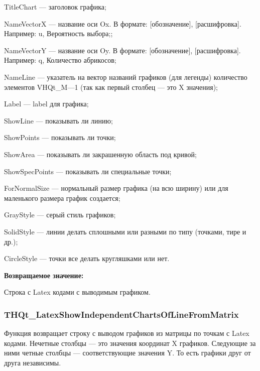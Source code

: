 \documentclass[a4paper,12pt]{article}
\begin{document}
TitleChart --- заголовок графика;
 
NameVectorX --- название оси Ox. В формате: [обозначение], [расшифровка]. Например: u, Вероятность выбора;;
 
NameVectorY --- название оси Oy. В формате: [обозначение], [расшифровка]. Например: q, Количество абрикосов;
 
NameLine --- указатель на вектор названий графиков (для легенды) количество элементов VHQt\_M---1 (так как первый столбец --- это X значения);
 
Label --- label для графика;
 
ShowLine --- показывать ли линию;
 
ShowPoints --- показывать ли точки;
 
ShowArea --- показывать ли закрашенную область под кривой;
 
ShowSpecPoints --- показывать ли специальные точки;
 
ForNormalSize --- нормальный размер графика (на всю ширину) или для маленького размера график создается;
 
GrayStyle --- серый стиль графиков;
 
SolidStyle --- линии делать сплошными или разными по типу (точками, тире и др.);
 
CircleStyle --- точки все делать кругляшками или нет.
	
\textbf{Возвращаемое значение:}

Строка с Latex кодами с выводимым графиком.


\subsubsection{THQt\_LatexShowIndependentChartsOfLineFromMatrix}\label{THQt_LatexShowIndependentChartsOfLineFromMatrix}

Функция возвращает строку с выводом графиков из матрицы по точкам с Latex кодами. Нечетные столбцы --- это значения координат X графиков. Следующие за ними четные столбцы --- соответствующие значения Y. То есть графики друг от друга независимы.
\end{document}
